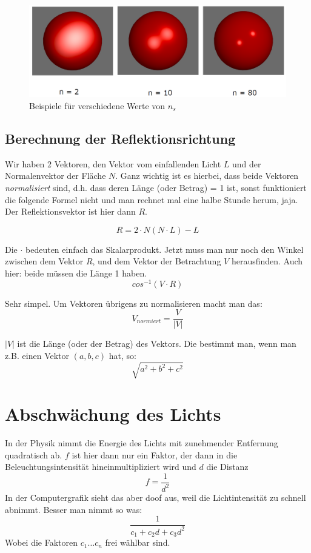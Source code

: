 \begin{figure}[!ht]
	\centering
	\includegraphics[width=0.4\linewidth]{fig/phong_koeffizienten}
	\caption{Beispiele für verschiedene Werte von \(n_s\)}
	\label{fig:phong_koeffizienten}
\end{figure}

\subsection{Berechnung der Reflektionsrichtung}
Wir haben 2 Vektoren, den Vektor vom einfallenden Licht \(L\) und der Normalenvektor der Fläche \(N\). Ganz wichtig ist es hierbei, dass beide Vektoren \textit{normalisiert} sind, d.h. dass deren Länge (oder Betrag) = 1 ist, sonst funktioniert die folgende Formel nicht und man rechnet mal eine halbe Stunde herum, jaja. Der Reflektionsvektor ist hier dann \(R\).

\begin{displaymath}
R = 2\cdot N(N\cdot L) - L
\end{displaymath}

Die \(\cdot \) bedeuten einfach das Skalarprodukt. Jetzt muss man nur noch den Winkel zwischen dem Vektor \(R\), und dem Vektor der Betrachtung \(V\) herausfinden. Auch hier: beide müssen die Länge 1 haben.
\begin{displaymath}
cos^{-1}(V\cdot R)
\end{displaymath}

Sehr simpel. Um Vektoren übrigens zu normalisieren macht man das:
\begin{displaymath}
V_{normiert} = \frac{V}{|V|}
\end{displaymath}

\(|V|\) ist die Länge (oder der Betrag) des Vektors. Die bestimmt man, wenn man z.B. einen Vektor \((a,b,c)\) hat, so:
\begin{displaymath}
\sqrt{a^2+b^2+c^2}
\end{displaymath}
\section{Abschwächung des Lichts}
In der Physik nimmt die Energie des Lichts mit zunehmender Entfernung quadratisch ab. \(f\) ist hier dann nur ein Faktor, der dann in die Beleuchtungsintensität hineinmultipliziert wird und \(d\) die Distanz
\begin{displaymath}
f = \frac{1}{d^2}
\end{displaymath}
In der Computergrafik sieht das aber doof aus, weil die Lichtintensität zu schnell abnimmt. Besser man nimmt so was:
\begin{displaymath}
\frac{1}{c_1+c_2d+c_3d^2}
\end{displaymath}
Wobei die Faktoren \(c_1 \dots c_n\) frei wählbar sind.


